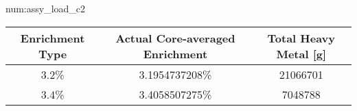 \begin{numitem}{num:assy_load_c2}
   \begin{center}
  \begin{tabular}{c c c}
    \toprule
    Enrichment Type & Actual Core-averaged Enrichment & Total Heavy Metal [g] \\
    \midrule
    \midrule
 3.2\%   &    3.1954737208\% & 21066701 \\
 3.4\%   &    3.4058507275\% & 7048788  \\
    \bottomrule
  \end{tabular}
 \end{center}
\end{numitem}
